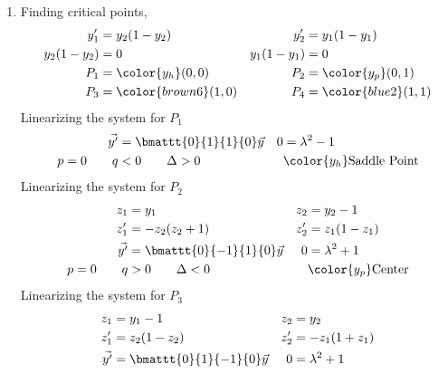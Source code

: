 \begin{enumerate}
    \item Finding critical points,
          \begin{align}
              y_1'         & = y_2(1 - y_2)          &
              y_2'         & = y_1(1 - y_1)            \\
              y_2(1 - y_2) & = 0                     &
              y_1(1 - y_1) & = 0                       \\
              P_1          & = \color{y_h}(0, 0)     &
              P_2          & = \color{y_p} (0, 1)      \\
              P_3          & = \color{brown6} (1, 0) &
              P_4          & = \color{blue2} (1, 1)
          \end{align}
          Linearizing the system for $ P_1 $
          \begin{align}
              \vec{y'}       & = \bmattt{0}{1}{1}{0} \vec{y}   &
              0              & = \lambda^{2} - 1                 \\
              p = 0 \qquad q & < 0 \qquad \Delta > 0           &
                             & \color{y_h} \text{Saddle Point}
          \end{align}
          Linearizing the system for $ P_2 $
          \begin{align}
              z_1            & = y_1                          &
              z_2            & = y_2 - 1                        \\
              z_1'           & =  -z_2(z_2 + 1)               &
              z_2'           & = z_1(1 - z_1)                   \\
              \vec{y'}       & = \bmattt{0}{-1}{1}{0} \vec{y} &
              0              & = \lambda^{2} + 1                \\
              p = 0 \qquad q & > 0 \qquad \Delta < 0          &
                             & \color{y_p} \text{Center}
          \end{align}
          Linearizing the system for $ P_3 $
          \begin{align}
              z_1            & = y_1 - 1                      &
              z_2            & = y_2                            \\
              z_1'           & =  z_2(1 - z_2)                &
              z_2'           & = -z_1(1 + z_1)                  \\
              \vec{y'}       & = \bmattt{0}{1}{-1}{0} \vec{y} &
              0              & = \lambda^{2} + 1                \\

\end{align}
\end{enumerate}
